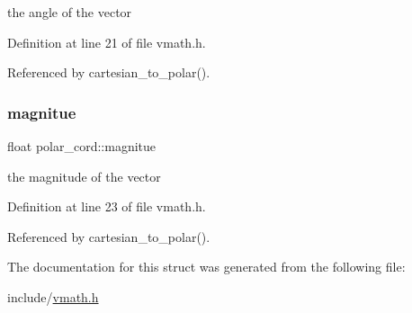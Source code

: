 the angle of the vector 

Definition at line 21 of file vmath.\+h.



Referenced by cartesian\+\_\+to\+\_\+polar().

\mbox{\label{structpolar__cord_aec2e25fecc82af176f0fcd23f1e02f0c}} 
\subsubsection{\texorpdfstring{magnitue}{magnitue}}
{\footnotesize\ttfamily float polar\+\_\+cord\+::magnitue}

the magnitude of the vector 

Definition at line 23 of file vmath.\+h.



Referenced by cartesian\+\_\+to\+\_\+polar().



The documentation for this struct was generated from the following file\+:\begin{DoxyCompactItemize}
\item 
include/\hyperlink{vmath_8h}{vmath.\+h}\end{DoxyCompactItemize}
